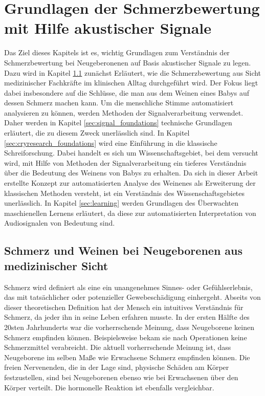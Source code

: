 \chapter{Grundlagen der Schmerzbewertung mit Hilfe akustischer Signale}

Das Ziel dieses Kapitels ist es, wichtig Grundlagen zum Verständnis der Schmerzbewertung bei Neugeberonenen auf Basis akustischer Signale zu legen. Dazu wird in Kapitel \ref{sec:medicalFoundations} zunächst Erläutert, wie die Schmerzbewertung aus Sicht medizinischer Fachkräfte im klinischen Alltag durchgeführt wird. Der Fokus liegt dabei insbesondere auf die Schlüsse, die man aus dem Weinen eines Babys auf dessen Schmerz machen kann. Um die menschliche Stimme automatisiert analysieren zu können, werden Methoden der Signalverarbeitung verwendet. Daher werden in  Kapitel \ref{sec:signal_foundations} technische Grundlagen erläutert, die zu diesem Zweck unerlässlich sind. In Kapitel \ref{sec:cryresearch_foundations} wird eine Einführung in die \glqq klassische Schreiforschung\grqq{}. Dabei handelt es sich um Wissenschaftsgebiet, bei dem versucht wird, mit Hilfe von Methoden der Signalverarbeitung ein tieferes Verständnis über die Bedeutung des Weinens von Babys zu erhalten. Da sich in dieser Arbeit erstellte Konzept zur automatisierten Analyse des Weinenes als Erweiterung der klassischen Methoden versteht, ist ein Verständnis des Wissenschaftsgebietes unerlässlich. In Kapitel \ref{sec:learning} werden Grundlagen des Überwachten maschienellen Lernens erläutert, da diese zur automatisierten Interpretation von Audiosignalen von Bedeutung sind.

\section{Schmerz und Weinen bei Neugeborenen aus medizinischer Sicht}
\label{sec:medicalFoundations} 

Schmerz wird definiert als eine \glqq ein unangenehmes Sinnes- oder Gefühlserlebnis, das mit tatsächlicher oder potenzieller Gewebeschädigung einhergeht\grqq{}.\cite[S. 438]{PainAssessment01} Abseits von dieser theoretischen Definition hat der Mensch ein intuitives Verständnis für Schmerz, da jeder ihn in seine Leben erfahren musste. In der ersten Hälfte des 20sten Jahrhunderts war die vorherrschende Meinung, dass Neugeborene keinen Schmerz empfinden können. Beispielsweise bekam sie nach Operationen keine Schmerzmittel verabreicht. Die aktuell vorherrschende Meinung ist, dass Neugeborene im selben Maße wie Erwachsene Schmerz empfinden können. Die freien Nervenenden, die in der Lage sind, physische Schäden am Körper festzustellen, sind bei Neugeborenen ebenso wie bei Erwachsenen über den Körper verteilt. Die hormonelle Reaktion ist ebenfalls vergleichbar. \cite[S. 402]{PainAssessment03} \cite[S. 438]{PainAssessment01}

